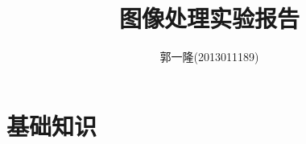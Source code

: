 \documentclass{article}
\author{郭一隆(2013011189)}
\title{图像处理实验报告}
\begin{document}
    \maketitle

    \tableofcontents
    \newpage

    \section{基础知识} %
    \label{sec:基础知识}

        
    
\end{document}
